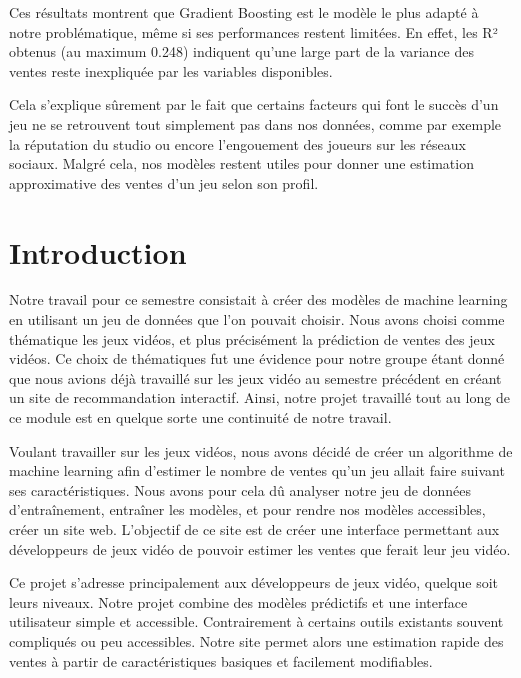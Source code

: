 \documentclass[mstat,12pt]{unswthesis}
\begin{document}
Ces résultats montrent que Gradient Boosting est le modèle le plus adapté à notre problématique, même si ses performances restent limitées. En effet, les R² obtenus (au maximum 0.248) indiquent qu'une large part de la variance des ventes reste inexpliquée par les variables disponibles.

Cela s'explique sûrement par le fait que certains facteurs qui font le succès d'un jeu ne se retrouvent tout simplement pas dans nos données, comme par exemple la réputation du studio ou encore l'engouement des joueurs sur les réseaux sociaux. Malgré cela, nos modèles restent utiles pour donner une estimation approximative des ventes d’un jeu selon son profil.



%
%






\hypertarget{introduction}{%
\chapter{Introduction}\label{introduction}}

Notre travail pour ce semestre consistait à créer des modèles de machine learning en utilisant un jeu de données que l’on pouvait choisir.
Nous avons choisi comme thématique les jeux vidéos, et plus précisément la prédiction de ventes des jeux vidéos. Ce choix de thématiques fut une
évidence pour notre groupe étant donné que nous avions déjà travaillé sur les jeux vidéo au semestre précédent en créant un site de recommandation interactif.
Ainsi, notre projet travaillé tout au long de ce module est en quelque sorte une continuité de notre travail.

Voulant travailler sur les jeux vidéos,
nous avons décidé de créer un algorithme de machine learning afin d’estimer le nombre de ventes qu’un jeu allait faire suivant ses caractéristiques.
Nous avons pour cela dû analyser notre jeu de données d’entraînement, entraîner les modèles, et pour rendre nos modèles accessibles, créer un site web.
L’objectif de ce site est de créer une interface permettant aux développeurs de jeux vidéo de pouvoir estimer les ventes que ferait leur jeu vidéo.

Ce projet s’adresse principalement aux développeurs de jeux vidéo, quelque soit leurs niveaux. Notre projet combine des modèles prédictifs et une interface utilisateur
simple et accessible. Contrairement à certains outils existants souvent compliqués ou peu accessibles.
Notre site permet alors une estimation rapide des ventes à partir de caractéristiques basiques et facilement modifiables.
\end{document}
